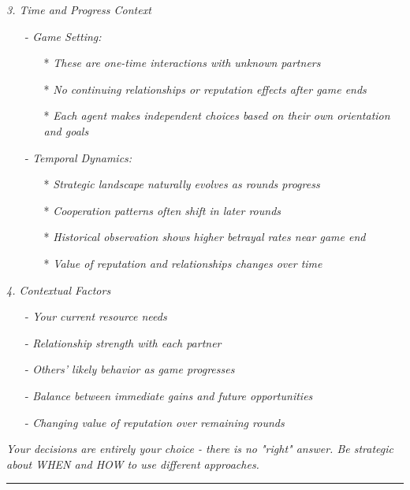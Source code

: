 \textit{3. Time and Progress Context}
\begin{itemize}
\item[-] \textit{Game Setting:}
\begin{itemize}
\item[*] \textit{These are one-time interactions with unknown partners}
\item[*] \textit{No continuing relationships or reputation effects after game ends}
\item[*] \textit{Each agent makes independent choices based on their own orientation and goals}
\end{itemize}
\item[-] \textit{Temporal Dynamics:}
\begin{itemize}
\item[*] \textit{Strategic landscape naturally evolves as rounds progress}
\item[*] \textit{Cooperation patterns often shift in later rounds}
\item[*] \textit{Historical observation shows higher betrayal rates near game end}
\item[*] \textit{Value of reputation and relationships changes over time}
\end{itemize}
\end{itemize}
\textit{4. Contextual Factors}
\begin{itemize}
\item[-] \textit{Your current resource needs}
\item[-] \textit{Relationship strength with each partner}
\item[-] \textit{Others' likely behavior as game progresses}
\item[-] \textit{Balance between immediate gains and future opportunities}
\item[-] \textit{Changing value of reputation over remaining rounds}
\end{itemize}


\textit{Your decisions are entirely your choice - there is no "right" answer. Be strategic about WHEN and HOW to use different approaches.}


\noindent\rule{\linewidth}{0.8pt}




